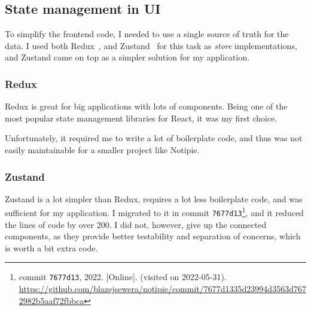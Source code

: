 \subsection{State management in UI}\label{state-management-in-ui}

To simplify the frontend code,
I needed to use a single source of truth for the data.
I used both Redux~\cite{gaeraon_redux_2022},
and Zustand~\cite{kato_zustand_2022} for this task
as \emph{store} implementations,
and Zustand came on top as a simpler solution for my application.

\subsubsection{Redux}\label{redux}

Redux is great for big applications with lots of components.
Being one of the most popular state management libraries for React,
it was my first choice.

Unfortunately,
it required me to write a lot of boilerplate code,
and thus was not easily maintainable
for a smaller project like Notipie.

\subsubsection{Zustand}\label{zustand}

Zustand is a lot simpler than Redux,
requires a lot less boilerplate code,
and was sufficient for my application.
I migrated to it in commit
\texttt{7677d13}\footnote{
  commit \texttt{7677d13}, 2022.
    [Online]. (visited on 2022-05-31).
  \url{https://github.com/blazejsewera/notipie/commit/7677d1335d23994d3563d7672982b5aaf72fbbca}
},
and it reduced the lines of code by over 200.
I did not, however, give up the connected components,
as they provide better testability and separation of concerns,
which is worth a bit extra code.
